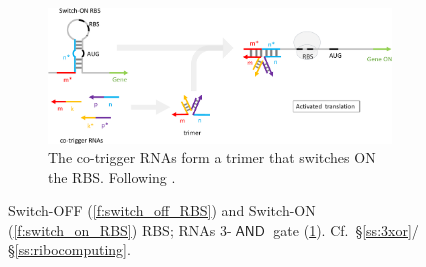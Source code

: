 \documentclass[12pt,notitlepage]{article}
\let\cite\citep
\newcommand{\AND}{\ensuremath{\mathop{\mathsf{AND}}}\xspace}
\begin{document}
\begin{figure}
    \begin{subfigure}{\linewidth}
        \centering
        \includegraphics[width=\linewidth]{xor_ribocomputing/3_trigger_rna_on}
        \caption{%
            The co-trigger RNAs form a trimer that switches ON the RBS.
            Following
            \cite[\href{https://www.nature.com/articles/nature23271/figures/3}{Fig.~3a}]{GreenETAL2017}.
        }
        \label{f:3_RNA_on_RBS}
    \end{subfigure}
    
    \caption{%
        Switch-OFF (\ref{f:switch_off_RBS})
        and 
        Switch-ON (\ref{f:switch_on_RBS}) RBS;
        RNAs 3-\AND gate (\ref{f:3_RNA_on_RBS}). 
        Cf.~\S\ref{ss:3xor}/\S\ref{ss:ribocomputing}.
    }
    \label{f:switch_RBS}
\end{figure}



    
    
\end{document}
